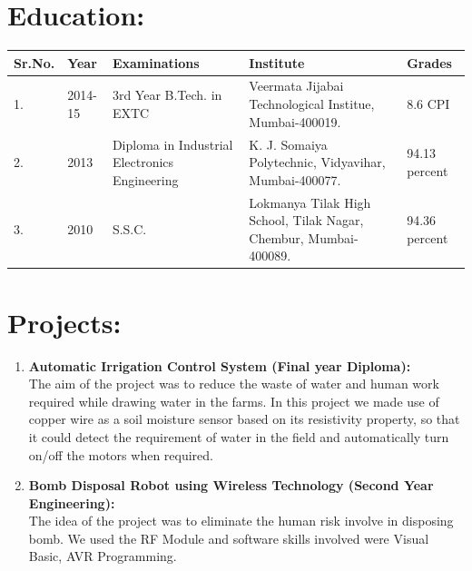 \documentclass[a4 paper,12pt]{article}
\begin{document}
\begin{minipage}{0.98\textwidth}
\section{Education:}
\vspace{-0.1in}
\begin{center}
	\begin{tabular}{|p{1.5cm}|p{2cm}|p{5cm}|p{4.5cm}|p{2.5cm}|}
		\hline
		\textbf{Sr.No.} & \textbf{Year} & \textbf{Examinations} & \textbf{Institute} & \textbf{Grades}\\ [0.5ex] 
		\hline
		1. & 2014-15 &3rd Year B.Tech. in EXTC & Veermata Jijabai Technological Institue, Mumbai-400019. & 8.6 CPI \\ 
		\hline
		2. & 2013 & Diploma in Industrial Electronics Engineering & K. J. Somaiya Polytechnic, Vidyavihar, Mumbai-400077.& 94.13 percent \\
		\hline
		3. & 2010 & S.S.C. & Lokmanya Tilak High School, Tilak Nagar, Chembur, Mumbai-400089. & 94.36 percent \\
		\hline
	\end{tabular}
\end{center}

\section{Projects:}
\begin{enumerate}
	\vspace{-0.1in}
	\item\textbf{Automatic Irrigation Control System (Final year Diploma):}\\
	The aim of the project was to reduce the waste of water and human work required while drawing water in the farms. In this project we made use of copper wire as a soil moisture sensor based on its resistivity property, so that it could detect the requirement of water in the field and automatically turn on/off the motors when required.
	\item\textbf{Bomb Disposal Robot using Wireless Technology (Second Year Engineering):}\\
	The idea of the project was to eliminate the human risk involve in disposing bomb. We used the RF Module and software skills involved were Visual Basic, AVR Programming.\\\\
\end{enumerate}
\end{minipage}
\end{document}
